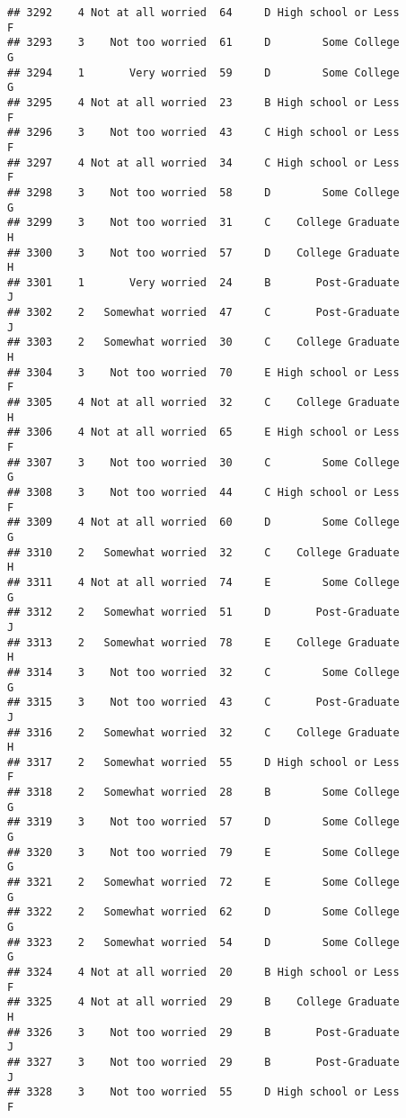 \documentclass[
]{article}
\begin{document}
\begin{verbatim}
## 3292    4 Not at all worried  64     D High school or Less         F
## 3293    3    Not too worried  61     D        Some College         G
## 3294    1       Very worried  59     D        Some College         G
## 3295    4 Not at all worried  23     B High school or Less         F
## 3296    3    Not too worried  43     C High school or Less         F
## 3297    4 Not at all worried  34     C High school or Less         F
## 3298    3    Not too worried  58     D        Some College         G
## 3299    3    Not too worried  31     C    College Graduate         H
## 3300    3    Not too worried  57     D    College Graduate         H
## 3301    1       Very worried  24     B       Post-Graduate         J
## 3302    2   Somewhat worried  47     C       Post-Graduate         J
## 3303    2   Somewhat worried  30     C    College Graduate         H
## 3304    3    Not too worried  70     E High school or Less         F
## 3305    4 Not at all worried  32     C    College Graduate         H
## 3306    4 Not at all worried  65     E High school or Less         F
## 3307    3    Not too worried  30     C        Some College         G
## 3308    3    Not too worried  44     C High school or Less         F
## 3309    4 Not at all worried  60     D        Some College         G
## 3310    2   Somewhat worried  32     C    College Graduate         H
## 3311    4 Not at all worried  74     E        Some College         G
## 3312    2   Somewhat worried  51     D       Post-Graduate         J
## 3313    2   Somewhat worried  78     E    College Graduate         H
## 3314    3    Not too worried  32     C        Some College         G
## 3315    3    Not too worried  43     C       Post-Graduate         J
## 3316    2   Somewhat worried  32     C    College Graduate         H
## 3317    2   Somewhat worried  55     D High school or Less         F
## 3318    2   Somewhat worried  28     B        Some College         G
## 3319    3    Not too worried  57     D        Some College         G
## 3320    3    Not too worried  79     E        Some College         G
## 3321    2   Somewhat worried  72     E        Some College         G
## 3322    2   Somewhat worried  62     D        Some College         G
## 3323    2   Somewhat worried  54     D        Some College         G
## 3324    4 Not at all worried  20     B High school or Less         F
## 3325    4 Not at all worried  29     B    College Graduate         H
## 3326    3    Not too worried  29     B       Post-Graduate         J
## 3327    3    Not too worried  29     B       Post-Graduate         J
## 3328    3    Not too worried  55     D High school or Less         F

\end{verbatim}
\end{document}

